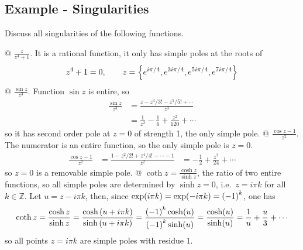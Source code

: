     \subsection{Example - Singularities}
    Discuss all singularities of the following functions.
    \begin{easylist}[itemize]
        @ $\frac{z}{z^4 + 1}$. It is a rational function, it only has simple
        poles at the roots of
        \begin{align*}
            z^4 + 1 = 0, \qquad z =
            {\left\{ e^{i\pi/4},e^{3i\pi/4},e^{5i\pi/4},e^{7i\pi/4} \right\}}
        \end{align*}
        @ $\frac{\sin z}{z^3}$. Function $\sin z$ is entire, so
        \begin{align*}
            \frac{\sin z}{z^3} &= \frac{z-z^3/3!-z^5/5!+\cdots}{z^3}\\
            &= \frac{1}{z^2} - \frac{1}{6} + \frac{z^2}{120} + \cdots
        \end{align*}
        so it has second order pole at $z=0$ of strength 1, the only simple
        pole.
        @ $\frac{\cos z - 1}{z^2}$. The numerator is an entire function, so the
        only simple pole is $z=0$.
        \begin{align*}
            \frac{\cos z - 1}{z^2} &= \frac{1-z^2/2!+z^4/4!-\cdots-1}{z^2}
            &= -\frac{1}{2} + \frac{z^2}{24} + \cdots
        \end{align*}
        so $z=0$ is a removable simple pole.
        @ $\coth z = \frac{\cosh z}{\sinh z}$, the ratio of two entire
        functions, so all simple poles are determined by $\sinh z = 0$, i.e.\
        $z=i\pi k$ for all $k \in \mathbb{Z}$. Let $u=z-i\pi k$, then, since
        $\exp(i\pi k) = \exp(-i \pi k) = {\left( -1 \right)}^k$, one has
        \begin{align*}
            \coth z = \frac{\cosh z}{\sinh z} =
            \frac{\cosh{\left( u+i\pi k \right)}}{\sinh{\left( u + i \pi k \right)}} =
            \frac{{\left( -1 \right)}^k \cosh(u)}{{\left( -1 \right)}^k \sinh(u)} =
            \frac{\cosh(u)}{\sinh(u)} =
            \frac{1}{u} + \frac{u}{3} + \cdots
        \end{align*}
        so all points $z=i \pi k$ are simple poles with residue 1.
    \end{easylist}

